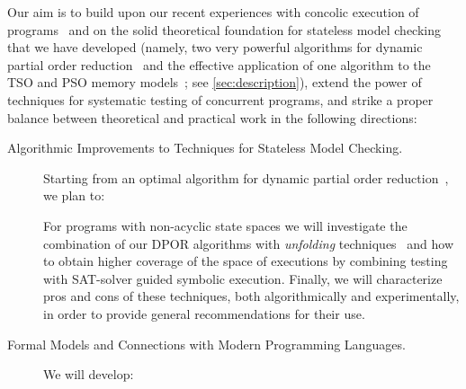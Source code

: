 \documentclass[11pt]{article}
\newcommand{\eg}{e.\/g.,\ }
\begin{document}
{Our aim is to build upon our recent experiences with concolic
execution of programs~\cite{CutEr@PPDP-15} and on the solid theoretical
foundation for stateless model checking that we have developed
(namely, two very powerful algorithms for dynamic partial order
reduction~\cite{DPOR@POPL-14} and the effective application of one
algorithm to the TSO and PSO memory
models~\cite{Nidhugg@TACAS-15}; see \cref{sec:description}),
extend the power of techniques for systematic testing of concurrent
programs, and strike a proper balance between theoretical and
practical work in the following directions:
\begin{description}
\item[Algorithmic Improvements to Techniques for Stateless Model Checking.]
  Starting from an optimal algorithm for dynamic partial order
  reduction~\cite{DPOR@POPL-14}, we plan to:%
  For programs with non-acyclic state spaces we will investigate the
  combination of our DPOR algorithms with \emph{unfolding}
  techniques~\cite{KSH:ase15,UnfoldingPOR@CONCUR-15} and how to
  obtain higher coverage of the space of executions by combining
  testing with SAT-solver guided symbolic execution. Finally, we will
  characterize pros and cons of these techniques, both algorithmically
  and experimentally, in order to provide general recommendations for their
  use.
\item[Formal Models and Connections with Modern Programming Languages.]
  We will develop:%
\end{description}}
\end{document}
